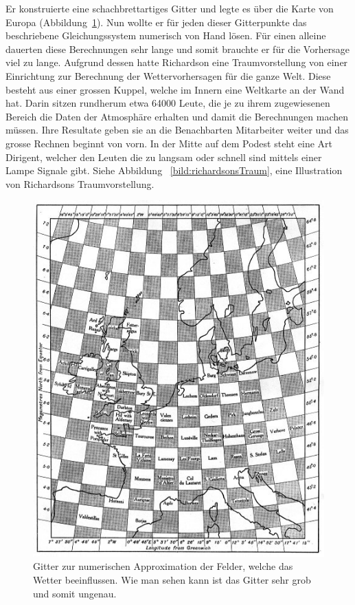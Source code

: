 Er konstruierte eine schachbrettartiges Gitter und legte es über die Karte von Europa (Abbildung~\ref{bild:karteEuropa}).
Nun wollte er für jeden dieser Gitterpunkte das beschriebene Gleichungssystem numerisch von Hand lösen.
Für einen alleine dauerten diese Berechnungen sehr lange und somit brauchte er für die Vorhersage viel zu lange.
Aufgrund dessen hatte Richardson eine Traumvorstellung von einer Einrichtung zur Berechnung der Wettervorhersagen für die ganze Welt.
Diese besteht aus einer grossen Kuppel, welche im Innern eine Weltkarte an der Wand hat. 
Darin sitzen rundherum etwa 64000 Leute, die je zu ihrem zugewiesenen Bereich die Daten der Atmosphäre erhalten und damit die Berechnungen machen müssen. 
Ihre Resultate geben sie an die Benachbarten Mitarbeiter weiter und das grosse Rechnen beginnt von vorn. 
In der Mitte auf dem Podest steht eine Art \glqq Dirigent\grqq, welcher den Leuten die zu langsam oder schnell sind mittels einer Lampe Signale gibt.
Siehe Abbildung ~\ref{bild:richardsonsTraum}, eine Illustration von Richardsons Traumvorstellung.  

\begin{figure}
	\centering
	\includegraphics{eingeteilte_Karte.jpg}
	\caption{Gitter zur numerischen Approximation der Felder, welche das Wetter beeinflussen.
		Wie man sehen kann ist das Gitter sehr grob und somit ungenau.}
	\label{bild:karteEuropa}
\end{figure}

